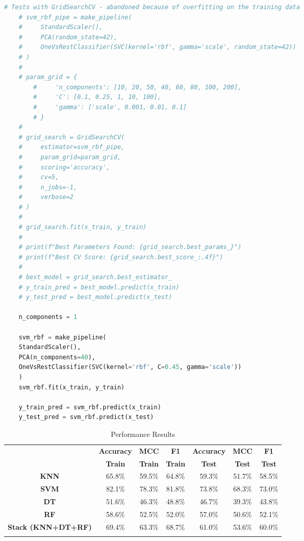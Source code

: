 \begin{lstlisting}[language=Python, caption=SVM - Model setup and training, label=SVM_Training]
	# Tests with GridSearchCV - abandoned because of overfitting on the training data
	# svm_rbf_pipe = make_pipeline(
	#     StandardScaler(),
	#     PCA(random_state=42),
	#     OneVsRestClassifier(SVC(kernel='rbf', gamma='scale', random_state=42))
	# )
	#
	# param_grid = {
		#     'n_components': [10, 20, 50, 40, 60, 80, 100, 200],
		#     'C': [0.1, 0.25, 1, 10, 100],
		#     'gamma': ['scale', 0.001, 0.01, 0.1]
		# }
	#
	# grid_search = GridSearchCV(
	#     estimator=svm_rbf_pipe,
	#     param_grid=param_grid,
	#     scoring='accuracy',
	#     cv=5,
	#     n_jobs=-1,
	#     verbose=2
	# )
	#
	# grid_search.fit(x_train, y_train)
	#
	# print(f"Best Parameters Found: {grid_search.best_params_}")
	# print(f"Best CV Score: {grid_search.best_score_:.4f}")
	#
	# best_model = grid_search.best_estimator_
	# y_train_pred = best_model.predict(x_train)
	# y_test_pred = best_model.predict(x_test)
	
	n_components = 1
	
	svm_rbf = make_pipeline(
	StandardScaler(),
	PCA(n_components=40),
	OneVsRestClassifier(SVC(kernel='rbf', C=0.45, gamma='scale'))
	)
	svm_rbf.fit(x_train, y_train)
	
	y_train_pred = svm_rbf.predict(x_train)
	y_test_pred = svm_rbf.predict(x_test)
\end{lstlisting}

\begin{longtable}[h]{c||c|c|c|c|c|c}  %
	& \textbf{Accuracy} & \textbf{MCC} & \textbf{F1} & \textbf{Accuracy} & \textbf{MCC} & \textbf{F1} \\
	& \textbf{Train} & \textbf{Train} & \textbf{Train} & \textbf{Test} & \textbf{Test} & \textbf{Test} \\ %
	\hline
	\hline
	\textbf{KNN} & 65.8\% & 59.5\% & 64.8\% & 59.3\% & 51.7\% & 58.5\% \\
	\hline
	\textbf{SVM} & 82.1\% & 78.3\% & 81.8\% & 73.8\% & 68.3\% & 73.0\% \\
	\hline
	\textbf{DT} & 51.6\% & 46.3\% & 48.8\% & 46.7\% & 39.3\% & 43.8\% \\
	\hline
	\textbf{RF} & 58.6\% & 52.5\% & 52.0\% & 57.0\% & 50.6\% & 52.1\% \\
	\hline
	\textbf{Stack (KNN+DT+RF)} & 69.4\% & 63.3\% & 68.7\% & 61.0\% & 53.6\% & 60.0\% \\
	\hline
	\caption{Performance Results}
	\label{tbl:testing}
\end{longtable} 

